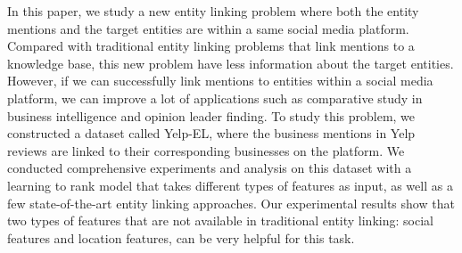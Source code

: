 In this paper, we study a new entity linking problem where both the entity mentions and the target entities are within a same social media platform. Compared with traditional entity linking problems that link mentions to a knowledge base, this new problem have less information about the target entities. However, if we can successfully link mentions to entities within a social media platform, we can improve a lot of applications such as comparative study in business intelligence and opinion leader finding. To study this problem, we constructed a dataset called Yelp-EL, where the business mentions in Yelp reviews are linked to their corresponding businesses on the platform. We conducted comprehensive experiments and analysis on this dataset with a learning to rank model that takes different types of features as input, as well as a few state-of-the-art entity linking approaches. Our experimental results show that two types of features that are not available in traditional entity linking: social features and location features, can be very helpful for this task.
